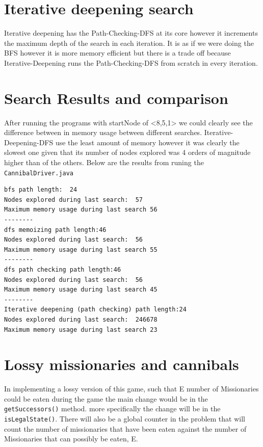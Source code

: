\documentclass{article}
\begin{document}
\section{Iterative deepening search}
Iterative deepening has the Path-Checking-DFS at its core however it increments the maximum depth of the search in each iteration. It is as if we were doing the BFS however it is more memory efficient but there is a trade off because Iterative-Deepening runs the Path-Checking-DFS from scratch in every iteration.

\section{Search Results and comparison}
After running the programs with startNode of <8,5,1> we could clearly see the difference between in memory usage between different searches. Iterative-Deepening-DFS use the least amount of memory however it was clearly the slowest one given that its number of nodes explored was 4 orders of magnitude higher than of the others. Below are the results from runing the \verb`CannibalDriver.java`
\begin{lstlisting}
bfs path length:  24
Nodes explored during last search:  57
Maximum memory usage during last search 56
--------
dfs memoizing path length:46
Nodes explored during last search:  56
Maximum memory usage during last search 55
--------
dfs path checking path length:46
Nodes explored during last search:  56
Maximum memory usage during last search 45
--------
Iterative deepening (path checking) path length:24
Nodes explored during last search:  246678
Maximum memory usage during last search 23
\end{lstlisting}



\section{Lossy missionaries and cannibals}
In implementing a lossy version of this game, such that E number of Missionaries could be eaten during the game the main change would be in the \verb`getSuccessors()` method. more specifically the change will be in the \verb`isLegalState()`. There will also be a global counter in the problem that will count the number of missionaries that have been eaten against the number of Missionaries that can possibly be eaten, E.
\end{document}
